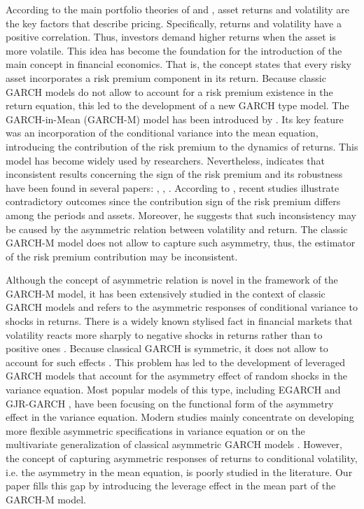 \documentclass[authoryear, 1p]{elsarticle}
\numberwithin{equation}{section}
\begin{document}
According to the main portfolio theories of \citep{Markowitz1952} and \citep{Sharpe1964}, asset returns and volatility are the key factors that describe pricing. Specifically, returns and volatility have a positive correlation. Thus, investors demand higher returns when the asset is more volatile. This idea has become the foundation for the introduction of the main concept in financial economics. That is, the concept states that every risky asset incorporates a risk premium component in its return. Because classic GARCH models do not allow to account for a risk premium existence in the return equation, this led to the development of a new GARCH type model. The GARCH-in-Mean (GARCH-M) model has been introduced by \citep{Engle1987}. Its key feature was an incorporation of the conditional variance into the mean equation, introducing the contribution of the risk premium to the dynamics of returns. This model has become widely used by researchers. 
Nevertheless, \citep{Bollerslev2022} indicates that inconsistent results concerning the sign of the risk premium and its robustness have been found in several papers: \citep{Hong2020}, \citep{Rossi2015}, \citep{Bollerslev2006}. According to \citep{Bollerslev2022}, recent studies illustrate contradictory outcomes since the contribution sign of the risk premium differs among the periods and assets. Moreover, he suggests that such inconsistency may be caused by the asymmetric relation between volatility and return. The classic GARCH-M model does not allow to capture such asymmetry, thus, the estimator of the risk premium contribution may be inconsistent.

Although the concept of asymmetric relation is novel in the framework of the GARCH-M model, it has been extensively studied in the context of classic GARCH models and refers to the asymmetric responses of conditional variance to shocks in returns. There is a widely known stylised fact in financial markets that volatility reacts more sharply to negative shocks in returns rather than to positive ones \citep{Zhang2006} \citep{Black1976}. Because classical GARCH is symmetric, it does not allow to account for such effects \citep{Nelson1991}. This problem has led to the development of leveraged GARCH models that account for the asymmetry effect of random shocks in the variance equation. Most popular models of this type, including EGARCH \citep{Nelson1991} and GJR-GARCH \citep{Glosten1993}, have been focusing on the functional form of the asymmetry effect in the variance equation. Modern studies mainly concentrate on developing more flexible asymmetric specifications in variance equation \citep{PGARCH} or on the multivariate generalization of classical asymmetric GARCH models \citep{MGJR}. However, the concept of capturing asymmetric responses of returns to conditional volatility,  i.e. the asymmetry in the mean equation, is poorly studied in the literature. Our paper fills this gap by introducing the leverage effect in the mean part of the GARCH-M model.
\end{document}
